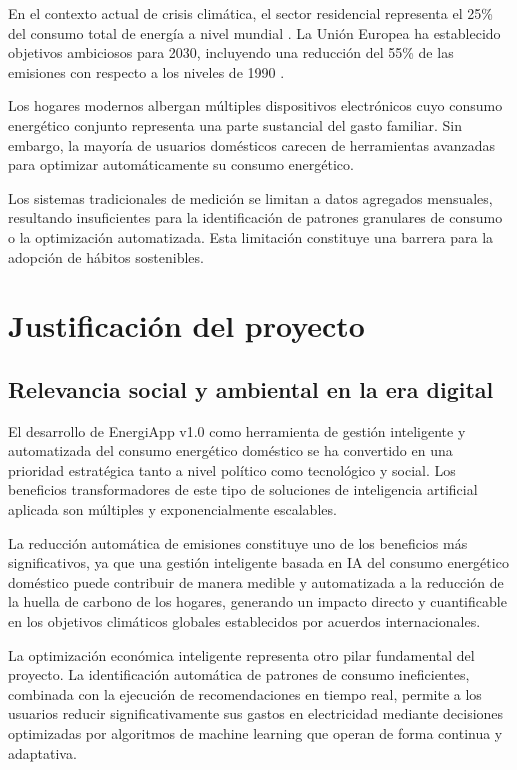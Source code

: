 En el contexto actual de crisis climática, el sector residencial representa el 25\% del consumo total de energía a nivel mundial \cite{iea2023}. La Unión Europea ha establecido objetivos ambiciosos para 2030, incluyendo una reducción del 55\% de las emisiones con respecto a los niveles de 1990 \cite{european_green_deal}.

Los hogares modernos albergan múltiples dispositivos electrónicos cuyo consumo energético conjunto representa una parte sustancial del gasto familiar. Sin embargo, la mayoría de usuarios domésticos carecen de herramientas avanzadas para optimizar automáticamente su consumo energético.

Los sistemas tradicionales de medición se limitan a datos agregados mensuales, resultando insuficientes para la identificación de patrones granulares de consumo o la optimización automatizada. Esta limitación constituye una barrera para la adopción de hábitos sostenibles.

\section{Justificación del proyecto}

\subsection{Relevancia social y ambiental en la era digital}

El desarrollo de EnergiApp v1.0 como herramienta de gestión inteligente y automatizada del consumo energético doméstico se ha convertido en una prioridad estratégica tanto a nivel político como tecnológico y social. Los beneficios transformadores de este tipo de soluciones de inteligencia artificial aplicada son múltiples y exponencialmente escalables.

La reducción automática de emisiones constituye uno de los beneficios más significativos, ya que una gestión inteligente basada en IA del consumo energético doméstico puede contribuir de manera medible y automatizada a la reducción de la huella de carbono de los hogares, generando un impacto directo y cuantificable en los objetivos climáticos globales establecidos por acuerdos internacionales.

La optimización económica inteligente representa otro pilar fundamental del proyecto. La identificación automática de patrones de consumo ineficientes, combinada con la ejecución de recomendaciones en tiempo real, permite a los usuarios reducir significativamente sus gastos en electricidad mediante decisiones optimizadas por algoritmos de machine learning que operan de forma continua y adaptativa.

